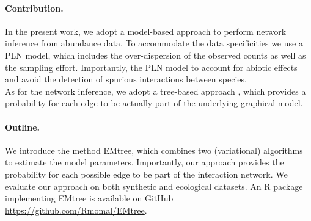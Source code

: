 \paragraph{Contribution.}
In the present work, we adopt a model-based approach to perform network inference from abundance data. To accommodate the data specificities we use a PLN model, which includes the over-dispersion of the observed counts as well as the sampling effort. Importantly, the PLN model  to account for abiotic effects and avoid the detection of spurious interactions between species.  \\
As for the network inference, we adopt a tree-based approach \citep[as opposed to][which also use a PLN model but resort to glasso]{MInt}, which provides a probability for each edge to be actually part of the underlying graphical model.

\paragraph{Outline.}
We introduce the method EMtree, which combines two (variational)  algorithms to estimate the model parameters. Importantly, our approach provides the probability for each possible edge to be part of the interaction network. We evaluate our approach on both synthetic and ecological datasets. An R package implementing EMtree is available on GitHub \url{https://github.com/Rmomal/EMtree}.  
